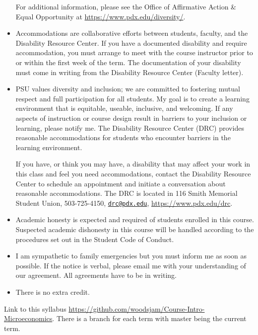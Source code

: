 \documentclass[
]{article}
\begin{document}
\begin{itemize}
  For additional information, please see the Office of Affirmative
  Action \& Equal Opportunity at \url{https://www.pdx.edu/diversity/}.
\item
  Accommodations are collaborative efforts between students, faculty,
  and the Disability Resource Center. If you have a documented
  disability and require accommodation, you must arrange to meet with
  the course instructor prior to or within the first week of the term.
  The documentation of your disability must come in writing from the
  Disability Resource Center (Faculty letter).
\item
  PSU values diversity and inclusion; we are committed to fostering
  mutual respect and full participation for all students. My goal is to
  create a learning environment that is equitable, useable, inclusive,
  and welcoming. If any aspects of instruction or course design result
  in barriers to your inclusion or learning, please notify me. The
  Disability Resource Center (DRC) provides reasonable accommodations
  for students who encounter barriers in the learning environment.

  If you have, or think you may have, a disability that may affect your
  work in this class and feel you need accommodations, contact the
  Disability Resource Center to schedule an appointment and initiate a
  conversation about reasonable accommodations. The DRC is located in
  116 Smith Memorial Student Union, 503-725-4150,
  \href{mailto:drc@pdx.edu}{\nolinkurl{drc@pdx.edu}},
  \url{https://www.pdx.edu/drc}.
\item
  Academic honesty is expected and required of students enrolled in this
  course. Suspected academic dishonesty in this course will be handled
  according to the procedures set out in the Student Code of Conduct.
\item
  I am sympathetic to family emergencies but you must inform me as soon
  as possible. If the notice is verbal, please email me with your
  understanding of our agreement. All agreements have to be in writing.
\item
  There is no extra credit.
\end{itemize}

Link to this syllabus
\url{https://github.com/woodsjam/Course-Intro-Microeconomics}. There is
a branch for each term with master being the current term.
\end{document}
